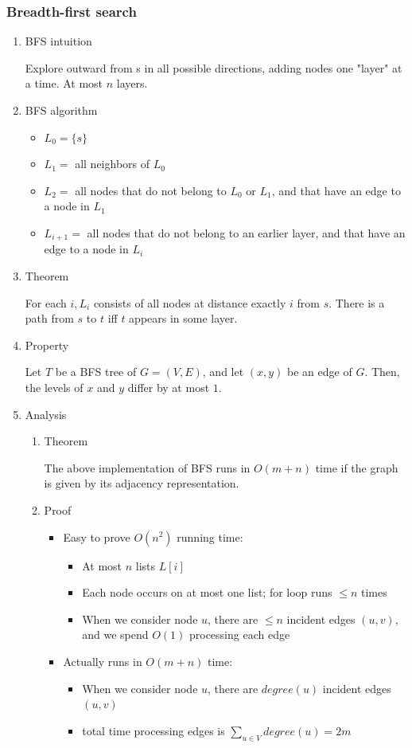 \documentclass[11pt]{article}
\begin{document}
\subsubsection{Breadth-first search}
\label{sec:org35f5199}
\begin{enumerate}
\item BFS intuition
\label{sec:org18cfaad}

Explore outward from s in all possible directions, adding nodes one "layer" at a time. At most \(n\) layers.
\item BFS algorithm
\label{sec:org05ad76a}
\begin{itemize}
\item \(L_0=\{s\}\)
\item \(L_1 =\) all neighbors of \(L_0\)
\item \(L_2 =\) all nodes that do not belong to \(L_0\) or \(L_1\), and that have an edge to a node in \(L_1\)
\item \(L_{i+1}=\) all nodes that do not belong to an earlier layer, and that have an edge to a node in \(L_i\)
\end{itemize}
\item Theorem
\label{sec:org353ac8d}

For each \(i, L_i\) consists of all nodes at distance exactly \(i\) from \(s\). There is a path from \(s\) to \(t\) iff \(t\) appears in some layer.
\item Property
\label{sec:org8661902}

Let \(T\) be a BFS tree of \(G=(V,E)\), and let \((x,y)\) be an edge of \(G\). Then, the levels of \(x\) and \(y\) differ by at most \(1\).

\item Analysis
\label{sec:org31a2023}
\begin{enumerate}
\item Theorem
\label{sec:org235e81f}

The above implementation of BFS runs in \(O(m+n)\) time if the graph is given by its adjacency representation.
\item Proof
\label{sec:orgbdde35f}
\begin{itemize}
\item Easy to prove \(O(n^2)\) running time:
\begin{itemize}
\item At most \(n\) lists \(L[i]\)
\item Each node occurs on at most one list; for loop runs \(\leq n\) times
\item When we consider node \(u\), there are \(\leq n\) incident edges \((u,v)\), and we spend \(O(1)\) processing each edge
\end{itemize}
\item Actually runs in \(O(m+n)\) time:
\begin{itemize}
\item When we consider node \(u\), there are \(degree(u)\) incident edges \((u,v)\)
\item total time processing edges is \(\sum_{u\in V} degree(u)=2m\)
\end{itemize}
\end{itemize}
\end{enumerate}
\end{enumerate}
\end{document}

